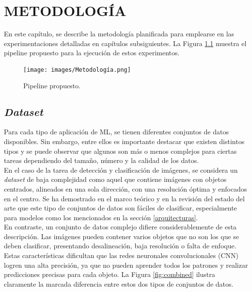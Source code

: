 \chapter{METODOLOG\'IA}

En este capítulo, se describe la metodología planificada para emplearse en 
las experimentaciones detalladas en capítulos subsiguientes. La Figura \ref{pipeline} 
muestra el pipeline propuesto para la ejecución de estos experimentos.  \\

\begin{figure}[h!]
\texttt{[image: images/Metodología.png]}
\centering
\caption{Pipeline propuesto.  }
\label{pipeline}
\end{figure}

\section{\textit{Dataset}}

Para cada tipo de aplicación de ML, se tienen diferentes conjuntos de datos 
disponibles. Sin embargo, entre ellos es importante destacar que existen 
distintos tipos y se puede observar que algunos son más o menos 
complejos para ciertas tareas dependiendo del tamaño, número y la 
calidad de los datos.
\\

En el caso de la tarea de detección y clasificación de imágenes, 
se considera un \textit{dataset} de baja complejidad como aquel 
que contiene imágenes con objetos centrados, alineados en una sola 
dirección, con una resolución óptima y enfocados en el centro. Se ha 
demostrado en el marco teórico y en la revisión del estado del arte que 
este tipo de conjuntos de datos son fáciles de clasificar, 
especialmente para modelos como los mencionados en la sección \ref{arquitecturas}.
\\

En contraste, un conjunto de datos complejo difiere considerablemente de 
esta descripción. Las imágenes pueden contener varios objetos que no son 
los que se deben clasificar, presentando desalineación, baja resolución 
o falta de enfoque. Estas características dificultan que las redes 
neuronales convolucionales (CNN) logren una alta precisión, ya que no 
pueden aprender todos los patrones y realizar predicciones precisas para 
cada objeto. La Figura \ref{fig:combined} ilustra claramente la marcada 
diferencia entre estos dos tipos de conjuntos de datos.
\\

